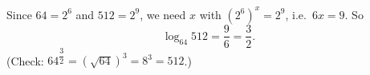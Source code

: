 Since $64=2^6$ and $512=2^9$, we need $x$ with $(2^6)^x=2^9$, i.e.\ $6x=9$. So
\[
\log_{64}512=\dfrac{9}{6}=\boxed{\dfrac{3}{2}}.
\]
(Check: $64^{\dfrac{3}{2}}=\left(\sqrt{64}\right)^3=8^3=512$.)
